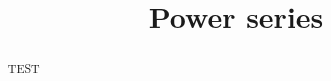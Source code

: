 \documentclass{ximera}
\title[Dig-In:]{Power series}
\begin{document}
\begin{abstract}
  TEST
\end{abstract}
\maketitle







\end{document}

